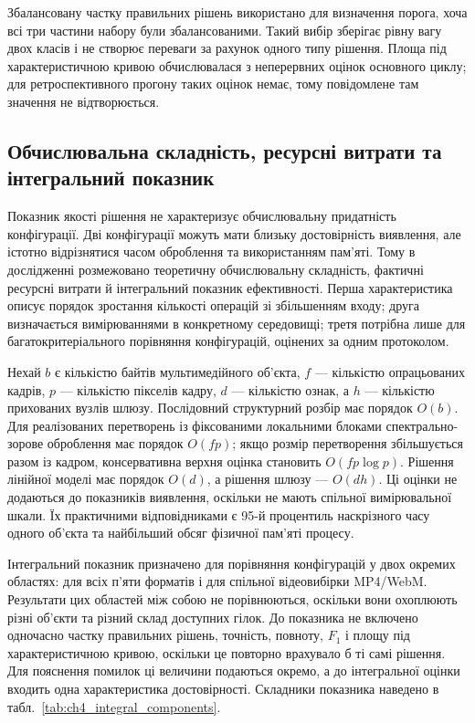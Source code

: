 Збалансовану частку правильних рішень використано для визначення порога, хоча всі три частини набору були збалансованими. Такий вибір зберігає рівну вагу двох класів і не створює переваги за рахунок одного типу рішення. Площа під характеристичною кривою обчислювалася з неперервних оцінок основного циклу; для ретроспективного прогону таких оцінок немає, тому повідомлене там значення не відтворюється.

\subsection{Обчислювальна складність, ресурсні витрати та інтегральний показник}

Показник якості рішення не характеризує обчислювальну придатність конфігурації. Дві конфігурації можуть мати близьку достовірність виявлення, але істотно відрізнятися часом оброблення та використанням пам’яті. Тому в дослідженні розмежовано теоретичну обчислювальну складність, фактичні ресурсні витрати й інтегральний показник ефективності. Перша характеристика описує порядок зростання кількості операцій зі збільшенням входу; друга визначається вимірюваннями в конкретному середовищі; третя потрібна лише для багатокритеріального порівняння конфігурацій, оцінених за одним протоколом.

Нехай $b$ є кількістю байтів мультимедійного об’єкта, $f$ --- кількістю опрацьованих кадрів, $p$ --- кількістю пікселів кадру, $d$ --- кількістю ознак, а $h$ --- кількістю прихованих вузлів шлюзу. Послідовний структурний розбір має порядок $O(b)$. Для реалізованих перетворень із фіксованими локальними блоками спектрально-зорове оброблення має порядок $O(fp)$; якщо розмір перетворення збільшується разом із кадром, консервативна верхня оцінка становить $O(fp\log p)$. Рішення лінійної моделі має порядок $O(d)$, а рішення шлюзу --- $O(dh)$. Ці оцінки не додаються до показників виявлення, оскільки не мають спільної вимірювальної шкали. Їх практичними відповідниками є 95-й процентиль наскрізного часу одного об’єкта та найбільший обсяг фізичної пам’яті процесу.

Інтегральний показник призначено для порівняння конфігурацій у двох окремих областях: для всіх п’яти форматів і для спільної відеовибірки MP4/WebM. Результати цих областей між собою не порівнюються, оскільки вони охоплюють різні об’єкти та різний склад доступних гілок. До показника не включено одночасно частку правильних рішень, точність, повноту, $F_1$ і площу під характеристичною кривою, оскільки це повторно врахувало б ті самі рішення. Для пояснення помилок ці величини подаються окремо, а до інтегральної оцінки входить одна характеристика достовірності. Складники показника наведено в табл.~\ref{tab:ch4_integral_components}.

